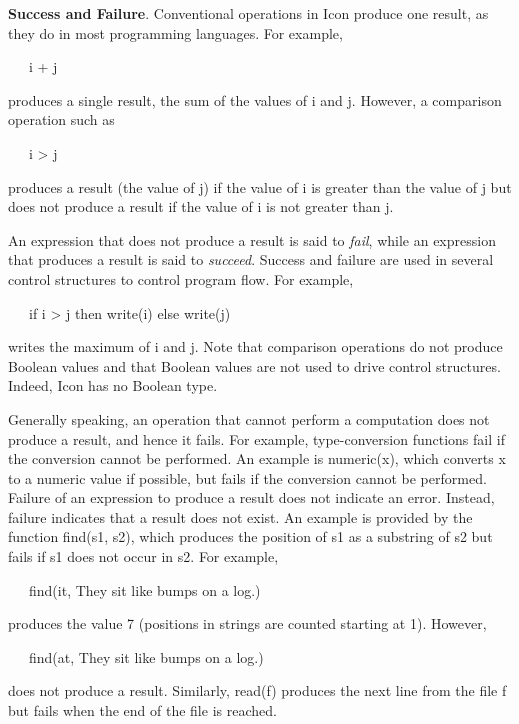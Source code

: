 \textbf{Success and Failure}. Conventional operations in Icon
produce one result, as they do in most programming languages. For
example,

{\ttfamily\mdseries
\ \ \ i + j}

\noindent produces a single result, the sum of the values of i and
j. However, a comparison operation such as

{\ttfamily\mdseries
\ \ \ i {\textgreater} j}

\noindent produces a result (the value of j) if the value of i is
greater than the value of j but does not produce a result if the value
of i is not greater than j.

An expression that does not produce a result is said to \textit{fail},
while an expression that produces a result is said to
\textit{succeed}. Success and failure are used in several control
structures to control program flow. For example,

{\ttfamily\mdseries
\ \ \ if i {\textgreater} j then write(i) else write(j)}

\noindent writes the maximum of i and j. Note that comparison
operations do not produce Boolean values and that Boolean values are
not used to drive control structures. Indeed, Icon has no Boolean
type.

Generally speaking, an operation that cannot perform a computation
does not produce a result, and hence it fails. For example,
type-conversion functions fail if the conversion cannot be
performed. An example is numeric(x), which converts x to a numeric
value if possible, but fails if the conversion cannot be
performed. Failure of an expression to produce a result does not
indicate an error. Instead, failure indicates that a result does not
exist. An example is provided by the function find(s1, s2), which
produces the position of s1 as a substring of s2 but fails if s1 does
not occur in s2.  For example,

{\ttfamily\mdseries
\ \ \ find({\textquotedbl}it{\textquotedbl}, {\textquotedbl}They sit like bumps on a log.{\textquotedbl})}


produces the value 7 (positions in strings are counted starting at 1). However,

{\ttfamily\mdseries
\ \ \ find({\textquotedbl}at{\textquotedbl}, {\textquotedbl}They sit like bumps on a log.{\textquotedbl})}


does not produce a result. Similarly, read(f) produces the next line from the file f but fails when the end of the file
is reached.


